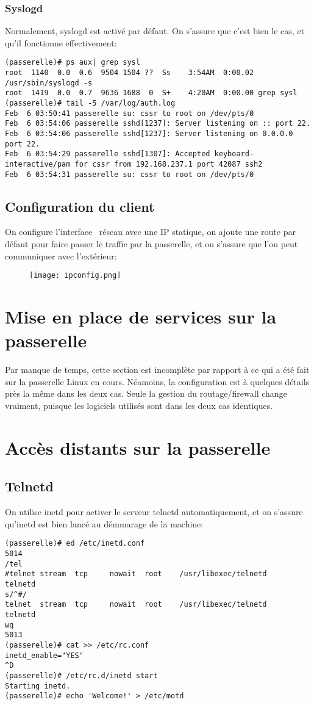 \subsubsection{Syslogd}
Normalement, syslogd est activé par défaut. On s'assure que c'est
bien le cas, et qu'il fonctionne effectivement:
\begin{verbatim}
(passerelle)# ps aux| grep sysl
root  1140  0.0  0.6  9504 1504 ??  Ss    3:54AM  0:00.02 /usr/sbin/syslogd -s
root  1419  0.0  0.7  9636 1688  0  S+    4:20AM  0:00.00 grep sysl
(passerelle)# tail -5 /var/log/auth.log
Feb  6 03:50:41 passerelle su: cssr to root on /dev/pts/0
Feb  6 03:54:06 passerelle sshd[1237]: Server listening on :: port 22.
Feb  6 03:54:06 passerelle sshd[1237]: Server listening on 0.0.0.0 port 22.
Feb  6 03:54:29 passerelle sshd[1307]: Accepted keyboard-interactive/pam for cssr from 192.168.237.1 port 42087 ssh2
Feb  6 03:54:31 passerelle su: cssr to root on /dev/pts/0
\end{verbatim}

\subsection{Configuration du client}
On configure l'\og interface \fg\ réseau avec une IP statique,
on ajoute une route par défaut pour faire passer le traffic par
la passerelle, et on s'assure que l'on peut communiquer avec
l'extérieur:
\begin{figure}[!ht]
	\centering
	\texttt{[image: ipconfig.png]}
\end{figure}

\section{Mise en place de services sur la passerelle}
Par manque de temps, cette section est incomplète par rapport
à ce qui a été fait sur la passerelle Linux en cours. Néamoins,
la configuration est à quelques détails près la même dans
les deux cas. Seule la gestion du routage/firewall change vraiment,
puisque les logiciels utilisés sont dans les deux cas identiques.

\section{Accès distants sur la passerelle}
\subsection{Telnetd}
On utilise inetd pour activer le serveur telnetd automatiquement,
et on s'assure qu'inetd est bien lancé au démmarage de la machine:
\begin{verbatim}
(passerelle)# ed /etc/inetd.conf 
5014
/tel
#telnet stream  tcp     nowait  root    /usr/libexec/telnetd    telnetd
s/^#/
telnet  stream  tcp     nowait  root    /usr/libexec/telnetd    telnetd
wq
5013
(passerelle)# cat >> /etc/rc.conf 
inetd_enable="YES"
^D
(passerelle)# /etc/rc.d/inetd start
Starting inetd.
(passerelle)# echo 'Welcome!' > /etc/motd
\end{verbatim}

